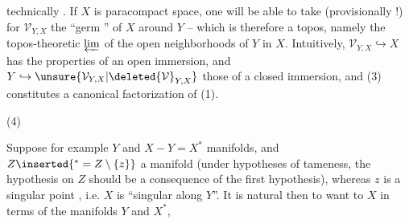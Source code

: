 
technically . If $X$ is   paracompact space, one will be able to take (provisionally !) for $\mathcal V_{Y,X}$ the ``germ '' of $X$ around $Y$ -- which is therefore a topos, namely the topos-theoretic $\varprojlim$ of the open neighborhoods of $Y$ in $X$. Intuitively, $\mathcal V_{Y,X}\hookrightarrow X$ has the properties of an open immersion, and $Y\hookrightarrow\unsure{\mathcal V_{Y,X}|\deleted{\mathcal V}_{Y,X}}$ those of a closed immersion, and (3) constitutes a canonical factorization of (1).



(4)

Suppose for example $Y$ and $X-Y=X^*$  manifolds, and $Z\inserted{{}^*=Z\setminus\{z\}}$ a manifold (under hypotheses of tameness, the hypothesis on $Z$ should be a consequence of the first hypothesis),  whereas $z$ is a singular point , i.e. $X$ is ``singular along $Y$''. It is natural then to want to  $X$ in terms of the manifolds $Y$ and $X^*$,

